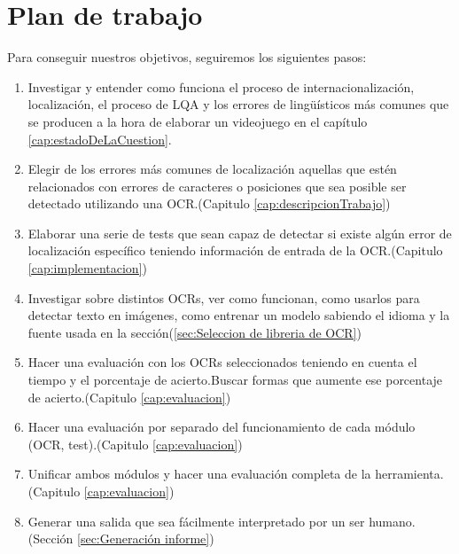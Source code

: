 \section{Plan de trabajo}
Para conseguir nuestros objetivos, seguiremos los siguientes pasos:
\begin{enumerate}
	\item Investigar y entender como funciona el proceso de internacionalización, localización, el proceso de LQA y los errores de lingüísticos más comunes que se producen a la hora de elaborar un videojuego en el capítulo \ref{cap:estadoDeLaCuestion}.
	\item Elegir de los errores más comunes de localización aquellas que estén relacionados con errores de caracteres o posiciones que sea posible ser detectado utilizando una OCR.(Capitulo \ref{cap:descripcionTrabajo})
	\item Elaborar una serie de tests que sean capaz de detectar si existe algún error de localización específico teniendo información de entrada de la OCR.(Capitulo \ref{cap:implementacion})
	\item Investigar sobre distintos OCRs, ver como funcionan, como usarlos para detectar texto en imágenes, como entrenar un modelo sabiendo el idioma y la fuente usada en la sección(\ref{sec:Seleccion de libreria de OCR})
	\item Hacer una evaluación con los OCRs seleccionados teniendo en cuenta el tiempo y el porcentaje de acierto.Buscar formas que aumente ese porcentaje de acierto.(Capitulo \ref{cap:evaluacion})
	\item Hacer una evaluación por separado del funcionamiento de cada módulo (OCR, test).(Capitulo \ref{cap:evaluacion})
	\item Unificar ambos módulos y hacer una evaluación completa de la herramienta.(Capitulo \ref{cap:evaluacion})
	\item Generar una salida que sea fácilmente interpretado por un ser humano. (Sección \ref{sec:Generación informe})
	
\end{enumerate}
